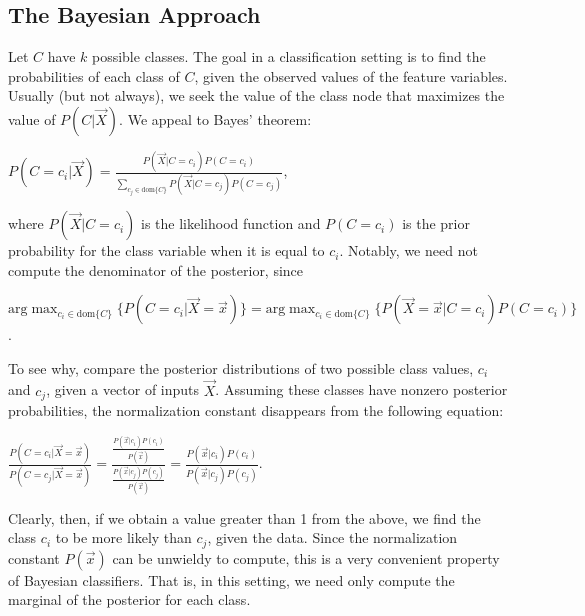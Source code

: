 \documentclass[12pt,twoside]{reedthesis}
\begin{document}
	\subsection*{The Bayesian Approach}
	Let $C$ have $k$ possible classes. 
	The goal in a classification setting is to find the probabilities of each class of $C$, given the observed values of the feature variables. Usually (but not always), we seek the value of the class node that maximizes the value of $P(C | \vec{X})$. We appeal to Bayes' theorem:
	\begin{center}
		$P(C = c_i | \vec{X}) = \displaystyle\frac{P(\vec{X} | C = c_i) P(C = c_i)}{\displaystyle\sum_{c_j \in \textrm{dom}\{C\}} P(\vec{X} | C = c_j)P(C=c_j)}$,
	\end{center}
	where $P(\vec{X} | C = c_i)$ is the likelihood function and $P(C = c_i)$ is the prior probability for the class variable when it is equal to $c_i$. Notably, we need not compute the denominator of the posterior, since
	\begin{center} 
	$\displaystyle\textrm{arg}\max_{c_i \in \textrm{dom}\{C\}}{\{ P(C=c_i | \vec{X} = \vec{x}) \}} = \displaystyle\textrm{arg}\max_{c_i \in \textrm{dom}\{C\}}\{ P(\vec{X} = \vec{x} | C = c_i) P(C=c_i) \}$.
	\end{center}
	To see why, compare the posterior distributions of two possible class values, $c_i$ and $c_j$, given a vector of inputs $\vec{X}$. Assuming these classes have nonzero posterior probabilities, the normalization constant disappears from the following equation:
	\begin{center}
		$\displaystyle\frac{P(C=c_i | \vec{X} = \vec{x})}{P(C=c_j | \vec{X} = \vec{x})} = 
		\displaystyle\frac{\displaystyle\frac{P(\vec{x} | c_i)P( c_i)}{P(\vec{x})}}{\displaystyle\frac{P(\vec{x} | c_j) P( c_j)}{P(\vec{x})}} = \frac{P(\vec{x} | c_i) P( c_i)}{P(\vec{x} | c_j) P( c_j)}$.
	\end{center}
	Clearly, then, if we obtain a value greater than 1 from the above, we find the class $c_i$ to be more likely than $c_j$, given the data. Since the normalization constant $P(\vec{x})$ can be unwieldy to compute, this is a very convenient property of Bayesian classifiers. That is, in this setting, we need only compute the marginal of the posterior for each class.
\end{document}
